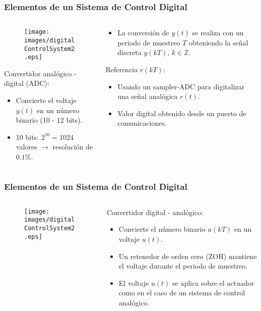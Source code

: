\documentclass[aspectratio=169,handout]{beamer}
\theoremstyle{definition}
\theoremstyle{plain}
\theoremstyle{remark}
\begin{document}
\begin{frame}[<+->]\frametitle{Elementos de un Sistema de Control Digital}
	\begin{columns}
		\begin{column}{0.5\textwidth}
			\begin{figure}
				\centering
				\texttt{[image: images/digitalControlSystem2.eps]}
			\end{figure}
			Convertidor analógico - digital (ADC):
			\begin{itemize}
				\item Convierte el voltaje $y(t)$ en un número binario (10 - 12 bits).
				\item 10 bits: $2^{10} = 1024$ valores $\rightarrow$ resolución de $0.1 \%$.
			\end{itemize}
		\end{column}
		\begin{column}{0.5\textwidth}
			\begin{itemize}
				\item La conversión de $y(t)$ se realiza con un periodo de muestreo $T$ obteniendo la señal discreta $y(kT)$, $k \in \mathbb{Z}$.
			\end{itemize}
			\pause
			Referencia $r(kT)$:
			\begin{itemize}
				\item Usando un sampler-ADC para digitalizar una señal analógica $r(t)$.
				\item Valor digital obtenido desde un puerto de comunicaciones.
			\end{itemize}
		\end{column}
	\end{columns}
\end{frame}

\begin{frame}[<+->]\frametitle{Elementos de un Sistema de Control Digital}
	\vspace*{-3mm}
	\begin{columns}
		\begin{column}{0.5\textwidth}
			\begin{figure}
				\centering
				\texttt{[image: images/digitalControlSystem2.eps]}
			\end{figure}
		\end{column}
		\begin{column}{0.5\textwidth}
			Convertidor digital - analógico:
			\begin{itemize}
				\item Convierte el número binario $u(kT)$ en un voltaje $u(t)$.
				\item Un retenedor de orden cero (ZOH) mantiene el voltaje durante el periodo de muestreo.
				\item El voltaje $u(t)$ se aplica sobre el actuador como en el caso de un sistema de control analógico.
			\end{itemize}
		\end{column}
	\end{columns}
\end{frame}
\end{document}
